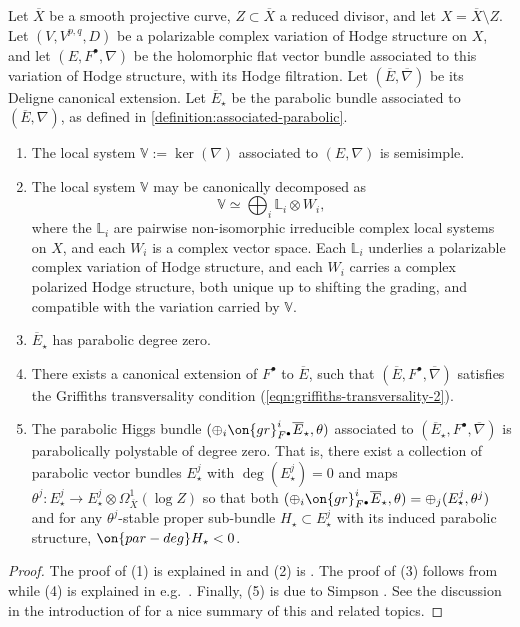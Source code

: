 \begin{proposition}
\notready\label{prop:basic-facts}
Let $\overline{X}$ be a smooth projective curve, $Z\subset
\overline{X}$ a reduced divisor, and let
$X=\overline{X}\setminus Z$.
Let $(V, V^{p,q}, D)$ be a polarizable complex variation of Hodge structure on
$X$,
and let $(E, F^\bullet,
\nabla)$ be the holomorphic flat vector bundle associated to this variation of
Hodge structure, with its Hodge filtration. Let $(\overline{E}, \overline{\nabla})$ be its Deligne canonical extension.
Let $\overline{E}_\star$ be the parabolic bundle associated to $(\overline{E}, \nabla)$, as defined in
\autoref{definition:associated-parabolic}.
\begin{enumerate}
    \item The local system $\mathbb{V}:=\ker(\nabla)$ associated to $(E, \nabla)$ is semisimple.
    \item The local system $\mathbb{V}$ may be canonically decomposed as $$\mathbb{V}\simeq \bigoplus_i \mathbb{L}_i\otimes
	    W_i,$$ where the $\mathbb{L}_i$ are pairwise non-isomorphic
	    irreducible complex local systems on $X$, and each $W_i$ is a complex vector
	    space. Each $\mathbb{L}_i$ underlies a polarizable complex
	    variation of Hodge structure, and each $W_i$ carries a complex polarized Hodge structure, both unique up to shifting the grading, and compatible with the variation carried by $\mathbb{V}$.
    \item $\overline{E}_\star$ has parabolic degree zero.
    \item There exists a canonical extension of $F^\bullet$ to $\overline{E}$, such that $(\overline{E}, F^\bullet, \overline{\nabla})$ satisfies the Griffiths transversality condition (\ref{eqn:griffiths-transversality-2}).
    \item The parabolic Higgs bundle $(\oplus_i
	    \on{gr}^i_{F^\bullet}\overline{E}_\star, \theta)$ associated
	    to $(\overline{E}_\star, F^\bullet, \overline{\nabla})$ is
	    parabolically polystable of degree zero.
	    That is, there exist a collection of parabolic vector bundles
	    $E^j_\star$ with
	    $\deg(E^j_\star) = 0$ and maps
	    $\theta^j : E^j_\star \to E^j_\star \otimes \Omega^1_{\overline{X}}(\log Z)$ so that
	    both
	    $(\oplus_i\on{gr}^i_{F^\bullet}\overline{E}_\star,
	    \theta)=\oplus_j (E^j_\star, \theta^j)$
	    and for any
	    $\theta^j$-stable proper sub-bundle $H_\star \subset
	    E^j_\star$ with its induced parabolic structure, $\on{par-deg}
	    H_\star < 0$.
\end{enumerate}
\end{proposition}
\begin{proof}
	The proof of
(1) is explained in \cite[1.11-1.12]{deligne1987theoreme} and (2) is
\cite[1.13]{deligne1987theoreme}. The proof of (3) follows from
\cite[B.3]{esnault1986logarithmic}
while (4) is explained in e.g.~\cite[Section 7]{brunebarbe2017semi}.
Finally,
(5) is due to Simpson \cite[Theorem 5]{simpson1990harmonic}.
See the discussion in the introduction of \cite{arapura2019vanishing} for a nice summary of this and related topics.
\end{proof}

